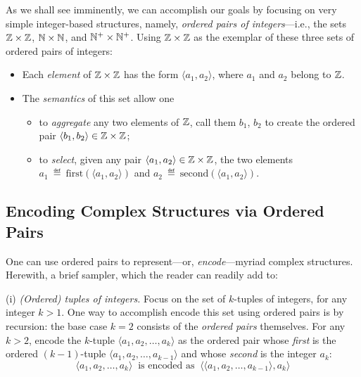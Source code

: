 As we shall see imminently, we can accomplish our goals by focusing on very simple integer-based structures, namely, {\em ordered pairs of integers}---i.e., the sets $\mathbb{Z} \times \mathbb{Z}$, $\mathbb{N} \times \mathbb{N}$, and $\mathbb{N}^+ \times \mathbb{N}^+$.  Using $\mathbb{Z} \times \mathbb{Z}$ as the exemplar of these three sets of ordered pairs of integers:
\begin{itemize}
\item
Each {\em element} of $\mathbb{Z} \times \mathbb{Z}$ has the form $\langle a_1, a_2 \rangle$, where $a_1$ and $a_2$ belong to $\mathbb{Z}$.
\medskip\item
The {\em semantics} of this set allow one
  \begin{itemize}
  \item
to {\em aggregate} any two elements of $\mathbb{Z}$, call them $b_1$, $b_2$ to create the ordered pair $\langle b_1, b_2 \rangle \in \mathbb{Z} \times \mathbb{Z}$;
  \medskip\item
to {\em select}, given any pair $\langle a_1, a_2 \rangle \in \mathbb{Z} \times \mathbb{Z}$,  the two elements $a_1 \ \eqdef \ \mbox{first}(\langle a_1, a_2 \rangle)$ and $a_2 \ \eqdef \ \mbox{second}(\langle a_1, a_2 \rangle)$.
  \end{itemize}
\end{itemize}

\subsection{Encoding Complex Structures via Ordered Pairs}
\label{sec:encodings-via-ordered-pairs}

One can use ordered pairs to represent---or, {\it encode}---myriad complex structures.  Herewith, a brief sampler, which the reader can readily add to:


\medskip

\noindent
(i) {\em (Ordered) tuples of integers.}
Focus on the set of $k$-tuples of integers, for any integer $k > 1$.  One way to accomplish encode this set using ordered pairs is by recursion:  the base case $k=2$ consists of the {\em ordered pairs} themselves.  For any $k > 2$, encode the $k$-tuple $\langle a_1, a_2, \ldots, a_k \rangle$ as the ordered pair whose {\em first} is the ordered $(k-1)$-tuple $\langle a_1, a_2, \ldots, a_{k-1} \rangle$ and whose {\em second} is the integer $a_k$:
\[ \langle a_1, a_2, \ldots, a_k \rangle \ \mbox{ is encoded as } \
\langle \langle a_1, a_2, \ldots, a_{k-1} \rangle, a_k \rangle \]


